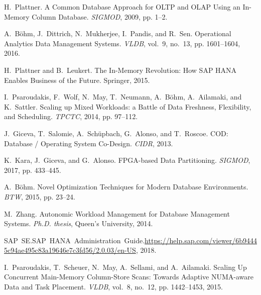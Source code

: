 \documentclass[11pt,dvipdfm]{article}
\begin{document}
\begin{thebibliography}{10}
\itemsep=1pt
\begin{small}
H.~Plattner. \newblock A Common Database Approach for OLTP and OLAP Using an In-Memory Column Database. \newblock \emph{SIGMOD}, 2009, pp. 1--2.

A.~B{\"{o}}hm, J.~Dittrich, N.~Mukherjee, I.~Pandis, and R.~Sen. \newblock Operational Analytics Data Management Systems. \newblock \emph{VLDB}, vol.~9, no.~13, pp.
1601--1604, 2016.

H.~Plattner and B.~Leukert. \newblock The In-Memory Revolution: How SAP HANA Enables Business of the Future. \newblock Springer, 2015.

I.~Psaroudakis, F.~Wolf, N.~May, T.~Neumann, A.~B{\"{o}}hm, A.~Ailamaki, and
K.~Sattler. \newblock Scaling up Mixed Workloads: a Battle of Data Freshness, Flexibility, and Scheduling. \newblock \emph{TPCTC}, 2014, pp. 97--112.

J.~Giceva, T.~Salomie, A.~Sch{\"{u}}pbach, G.~Alonso, and T.~Roscoe. \newblock COD: Database / Operating System Co-Design. \newblock \emph{CIDR}, 2013.

K.~Kara, J.~Giceva, and G.~Alonso. \newblock FPGA-based Data Partitioning. \newblock \emph{SIGMOD}, 2017, pp. 433--445.

A.~B{\"{o}}hm. \newblock Novel Optimization Techniques for Modern Database Environments. \newblock \emph{BTW}, 2015, pp. 23--24.

M.~Zhang. \newblock Autonomic Workload Management for Database Management Systems. \newblock \emph{Ph.D. thesis}, Queen's University, 2014.

\mbox{SAP SE}.\hspace{1mm}\mbox{SAP HANA Administration Guide}.\hspace{1mm}\url{https://help.sap.com/viewer/6b94445c94ae495c83a19646e7c3fd56/2.0.03/en-US}, 2018.

I.~Psaroudakis, T.~Scheuer, N.~May, A.~Sellami, and A.~Ailamaki. \newblock Scaling Up Concurrent Main-Memory Column-Store Scans: Towards Adaptive NUMA-aware Data and Task Placement. \newblock \emph{VLDB}, vol.~8, no.~12, pp. 1442--1453,
2015.


\end{small}
\end{thebibliography}
\end{document}
